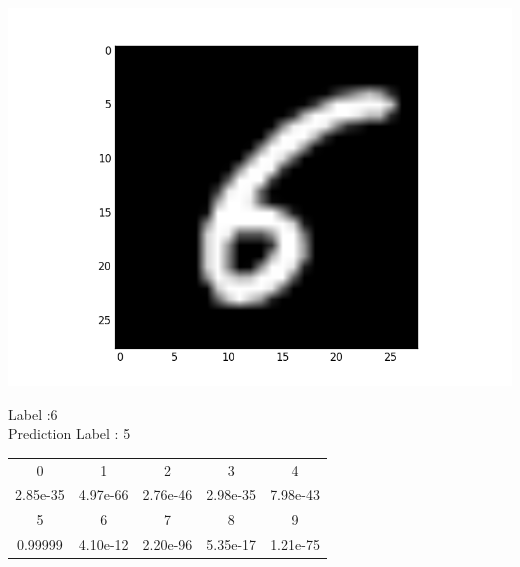\documentclass{article}
\begin{document}
\noindent\begin{minipage}{0.5\textwidth}
	\includegraphics[width=\linewidth]{hw3_f6}
\end{minipage}%
\hfill%
\begin{minipage}{0.5\textwidth}
	Label :6\\
	Prediction Label : 5\\
	\begin{tabular}{ | c | c | c | c | c | }
		\hline
		0 & 1 & 2 & 3 & 4 \\		
2.85e-35 &
4.97e-66 &
2.76e-46 &
2.98e-35 &
7.98e-43 \\
		\hline
		5 & 6 & 7 & 8 & 9 \\
0.99999 &
4.10e-12 &
2.20e-96 &
5.35e-17 &
1.21e-75 \\
		\hline
	\end{tabular}\\
\end{minipage}
\end{document}
